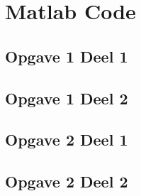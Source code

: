  \chapter{Matlab Code}
 \section{Opgave 1 Deel 1}

\newpage
 \section{Opgave 1 Deel 2}

\newpage
 \section{Opgave 2 Deel 1}

\newpage
 \section{Opgave 2 Deel 2}

